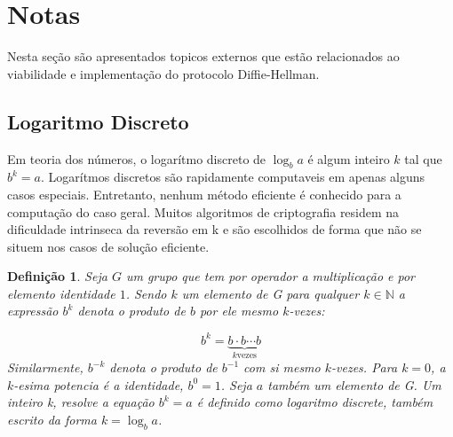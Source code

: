 \documentclass{article}
\newtheorem*{definition}{Definição}
\begin{document}
\section{Notas}%
\label{sec:notas}
Nesta seção são apresentados topicos externos que estão relacionados ao
viabilidade e implementação do protocolo Diffie-Hellman.

\subsection{Logaritmo Discreto}%
\label{sub:logaritmo_discreto}
Em teoria dos números, o logarítmo discreto de $\log_{b}{a}$ é algum inteiro
$k$ tal que $b^k=a$. Logarítmos discretos são rapidamente computaveis em apenas
alguns casos especiais. Entretanto, nenhum método eficiente é conhecido para
a computação do caso geral. Muitos algoritmos de criptografia residem na
dificuldade intrinseca da reversão em k e são escolhidos de forma que não se
situem nos casos de solução eficiente.

\begin{definition}
    Seja $G$ um grupo que tem por operador a multiplicação e por elemento
    identidade $1$. Sendo $k$ um elemento de G para qualquer
    $k \in \mathbb{N}$ a expressão $b^k$ denota o produto de $b$ por ele mesmo
    $k$-vezes:

    \[
    b^{k}=\underbrace{b\cdot b\cdots b}_{k\text{vezes}}
    \]
    Similarmente, $b^{-k}$ denota o produto de $b^{-1}$ com si mesmo $k$-vezes.
    Para $k=0$, a $k$-esima potencia é a identidade, $b^0=1$. Seja $a$ também
    um elemento de G. Um inteiro k, resolve a equação $b^k=a$ é definido como
    logaritmo discrete, também escrito da forma $k=\log_b{a}$.
\end{definition}




\end{document}
